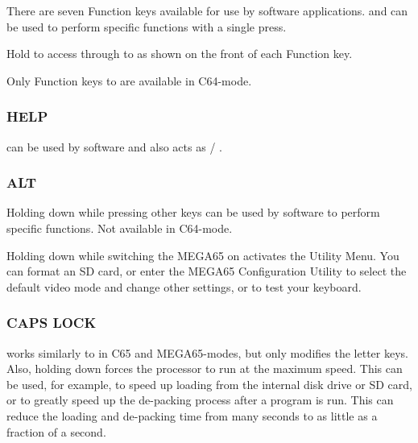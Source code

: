 There are seven Function keys available for use by software applications.       and  can be used to perform specific functions with a single press.

Hold  to access  through to  as shown on the front of each Function key.

Only Function keys  to  are available in C64-mode.

\subsubsection{HELP}

 can be used by software and also acts as  / .

\subsubsection{ALT}

Holding  down while pressing other keys can be used by software to perform specific functions. Not available in C64-mode.

Holding  down while switching the MEGA65 on activates the Utility Menu. You can format an SD card, or enter the MEGA65 Configuration Utility to select the default video mode and change other settings, or to test your keyboard.

\subsubsection{CAPS LOCK}

 works similarly to  in C65 and MEGA65-modes, but only modifies the letter keys.
Also, holding  down forces the processor to run at the maximum speed. This can be used, for example,
to speed up loading from the internal disk drive or SD card, or to greatly speed up the de-packing process after a program is run.
This can reduce the loading and de-packing time from many seconds to as little as a fraction of a second.
